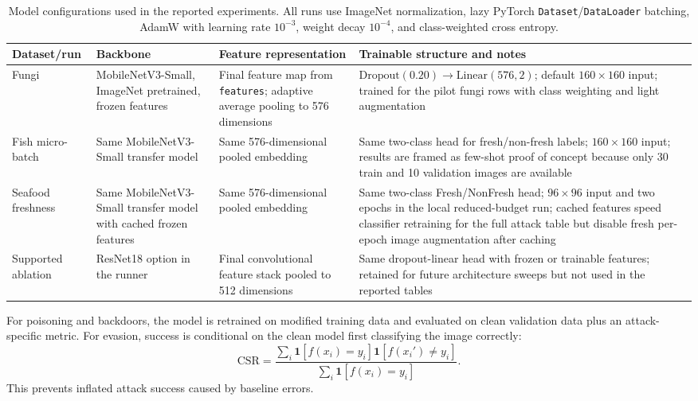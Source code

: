 ﻿\documentclass[6p,10pt,times]{ieeeaccess}
\begin{document}
\begin{table}[t]
\centering
\caption{Model configurations used in the reported experiments. All runs use ImageNet normalization, lazy PyTorch \texttt{Dataset}/\texttt{DataLoader} batching, AdamW with learning rate \(10^{-3}\), weight decay \(10^{-4}\), and class-weighted cross entropy.}
\label{tab:modelconfigs}
\small
\begin{tabular}{p{}p{}p{}p{}}
\toprule
Dataset/run & Backbone & Feature representation & Trainable structure and notes \\
\midrule
Fungi & MobileNetV3-Small, ImageNet pretrained, frozen features & Final feature map from \texttt{features}; adaptive average pooling to 576 dimensions & \(\mathrm{Dropout}(0.20)\rightarrow\mathrm{Linear}(576,2)\); default \(160\times160\) input; trained for the pilot fungi rows with class weighting and light augmentation \\
Fish micro-batch & Same MobileNetV3-Small transfer model & Same 576-dimensional pooled embedding & Same two-class head for fresh/non-fresh labels; \(160\times160\) input; results are framed as few-shot proof of concept because only 30 train and 10 validation images are available \\
Seafood freshness & Same MobileNetV3-Small transfer model with cached frozen features & Same 576-dimensional pooled embedding & Same two-class Fresh/NonFresh head; \(96\times96\) input and two epochs in the local reduced-budget run; cached features speed classifier retraining for the full attack table but disable fresh per-epoch image augmentation after caching \\
Supported ablation & ResNet18 option in the runner~\cite{resnet} & Final convolutional feature stack pooled to 512 dimensions & Same dropout-linear head with frozen or trainable features; retained for future architecture sweeps but not used in the reported tables \\
\bottomrule
\end{tabular}
\end{table}

For poisoning and backdoors, the model is retrained on modified training data and evaluated on clean validation data plus an attack-specific metric. For evasion, success is conditional on the clean model first classifying the image correctly:
\begin{equation}
\mathrm{CSR}=
\frac{\sum_i \mathbf{1}[f(x_i)=y_i]\mathbf{1}[f(x_i')\neq y_i]}
{\sum_i \mathbf{1}[f(x_i)=y_i]}.
\label{eq:csr}
\end{equation}
This prevents inflated attack success caused by baseline errors.
\end{document}
